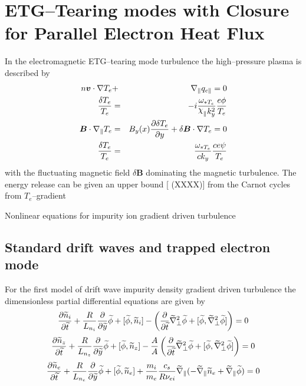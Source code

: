 \documentclass[a4paper,openany,12pt]{book}
\def\chix{\raise.5ex\hbox{$\chi$}}
\begin{document}
\section{ETG--Tearing modes with Closure for Parallel Electron Heat Flux}

In the electromagnetic ETG--tearing mode turbulence the high--pressure plasma is described by
%
\begin{eqnarray*}
n\bm{v}\cdot\nabla T_e&+&\nabla_\| q_{e\|}=0\\
{\delta T_e\over T_e}&=&-i{\omega_{*T_e}\over\chix_\|k^2_y}{e\phi\over T_e}\\
\bm{B}\cdot\nabla_\|T_e&=&B_y(x){\partial\delta T_e\over\partial y}+\delta\bm{B}\cdot\nabla T_e=0\\
{\delta T_e\over T_e}&=&{\omega_{*T_e}\over ck_y}{ce\psi\over T_e}
\end{eqnarray*}
with the fluctuating magnetic field $\delta\bm{B}$ dominating the magnetic turbulence.
The energy release can be given an upper bound [\emph{} (XXXX)] from the Carnot cycles from $T_e$--gradient

\noindent Nonlinear equations for impurity ion gradient driven turbulence

\subsection{Standard drift waves and trapped electron mode}

For the first model of drift wave impurity density gradient driven turbulence the dimensionless partial differential equations are given by
\begin{equation}
{\partial\widetilde n_i\over\partial\widetilde t}+{R\over L_{n_i}}
{\partial\over\partial\widetilde y}\widetilde\phi+[\widetilde\phi,\widetilde n_i]-\left({\partial\over\partial\widetilde t}\widetilde\nabla^2_\perp\widetilde\phi+[\widetilde\phi, \widetilde\nabla^2_\perp\widetilde\phi]\right)=0\label{model-1}
\end{equation}
%
\begin{equation}
{\partial\widetilde n_z\over\partial\widetilde t}+{R\over L_{n_z}}{\partial\over\partial\widetilde y}\widetilde\phi+[\widetilde\phi,\widetilde n_z]-{A\over A}\left({\partial\over\partial\widetilde t}\widetilde\nabla^2_\perp\widetilde\phi+[\widetilde\phi, \widetilde\nabla^2_\perp\widetilde\phi]\right)=0\label{model-2}
\end{equation}
%
\begin{equation}
{\partial\widetilde n_e\over\partial\widetilde t}+{R\over L_{n_e}}{\partial\over\partial\widetilde y}\widetilde\phi+[\widetilde\phi,\widetilde n_e]+{m_i\over m_e}{c_s\over R\nu_{ei}}\widetilde\nabla_\|(-\widetilde\nabla_\|\widetilde n_e+\widetilde\nabla_\|\widetilde\phi)=0
\end{equation}
\end{document}
